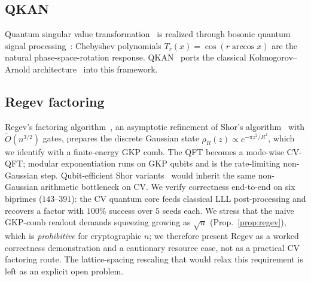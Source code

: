 \documentclass[aps,pra,reprint,superscriptaddress,nofootinbib]{revtex4-2}
\begin{document}
\subsection{QKAN}
Quantum singular value transformation~\cite{Low2017,Gilyen2019} is realized
through bosonic quantum signal processing~\cite{Rossi2022}: Chebyshev
polynomials $T_r(x)=\cos(r\arccos x)$ are the natural phase-space-rotation
response. QKAN~\cite{Ivashkov2024} ports the classical Kolmogorov--Arnold
architecture~\cite{Liu2024} into this framework.

\subsection{Regev factoring}
Regev's factoring algorithm~\cite{Regev2023}, an asymptotic refinement of
Shor's algorithm~\cite{Shor1997} with $\tilde O(n^{3/2})$ gates,
prepares the discrete Gaussian state
$\rho_R(z)\propto e^{-\pi z^2/R^2}$, which we identify with a
finite-energy GKP comb. The QFT becomes a mode-wise CV-QFT; modular
exponentiation runs on GKP qubits and is the rate-limiting non-Gaussian
step. Qubit-efficient Shor variants~\cite{Beauregard2003} would inherit
the same non-Gaussian arithmetic bottleneck on CV.
We verify correctness end-to-end on six biprimes ($143$--$391$): the CV
quantum core feeds classical LLL post-processing and recovers a factor with
$100\%$ success over $5$ seeds each. We stress that the naive GKP-comb readout
demands squeezing growing as $\sqrt{n}$ (Prop.~\ref{prop:regev}), which is
\emph{prohibitive} for cryptographic $n$; we therefore present Regev as a
worked correctness demonstration and a cautionary resource case, not as a
practical CV factoring route. The lattice-spacing rescaling that would relax
this requirement is left as an explicit open problem.
\end{document}
